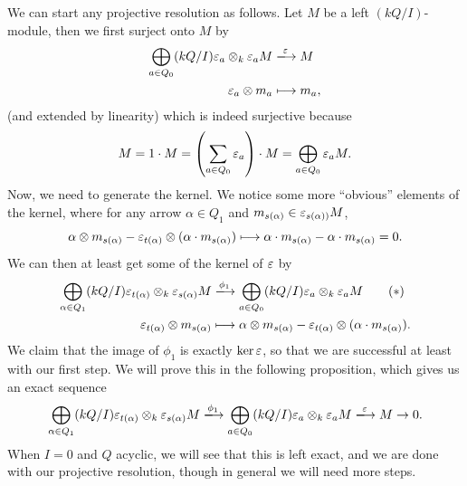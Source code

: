 \documentclass[12pt]{article}
\begin{document}
\begin{construction}\label{quiver-res}
    We can start any projective resolution as follows. Let $M$ be a left $(kQ/I)$-module, then we first surject onto $M$ by
    \begin{align*}
        \bigoplus_{a\in Q_0} (kQ/I) \eps_a \otimes_k \eps_a M & \xlongrightarrow{\eps} M\\
        \eps_a \otimes m_a &\longmapsto m_a,
    \end{align*}
    (and extended by linearity) which is indeed surjective because
    \[M = 1\cdot M = \left(\sum_{a\in Q_0} \varepsilon_a\right) \cdot M = \bigoplus_{a\in Q_0} \varepsilon_a M.\]
    Now, we need to generate the kernel. We notice some more ``obvious'' elements of the kernel, where for any arrow $\alpha \in Q_1$ and $m_{s(\alpha)} \in \varepsilon_{s(\alpha))} M$,
    \[\alpha \otimes m_{s(\alpha)} - \varepsilon_{t(\alpha)} \otimes (\alpha\cdot m_{s(\alpha)}) \longmapsto \alpha \cdot m_{s(\alpha)} - \alpha \cdot m_{s(\alpha)} = 0.\]
    We can then at least get some of the kernel of $\varepsilon$ by
    \begin{align*}
        \bigoplus_{\alpha\in Q_1} (kQ/I)\eps_{t(\alpha)} \otimes_k \eps_{s(\alpha)} M &\xlongrightarrow{\phi_1} \bigoplus_{a\in Q_0} (kQ/I)\eps_a \otimes_k \eps_a M \tag{$*$}\label{kernel-generation}\\
        \eps_{t(\alpha)} \otimes m_{s(\alpha)} &\longmapsto \alpha \otimes m_{s(\alpha)} - \eps_{t(\alpha)} \otimes (\alpha \cdot m_{s(\alpha)}).
    \end{align*}
    We claim that the image of $\phi_1$ is exactly $\ker \varepsilon$, so that we are successful at least with our first step. We will prove this in the following proposition, which gives us an exact sequence
    \[\bigoplus_{\alpha\in Q_1} (kQ/I)\eps_{t(\alpha)} \otimes_k \eps_{s(\alpha)} M \xlongrightarrow{\phi_1} \bigoplus_{a\in Q_0} (kQ/I)\eps_a \otimes_k \eps_a M \xlongrightarrow{\eps} M \to 0.\]
    When $I=0$ and $Q$ acyclic, we will see that this is left exact, and we are done with our projective resolution, though in general we will need more steps.
\end{construction}
\end{document}
